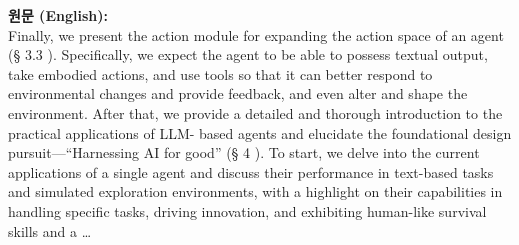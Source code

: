 \documentclass[12pt,a4paper]{article}
\begin{document}
\begin{mdframed}[style=orig]
\noindent\textbf{\small 원문 (English):}\\[2pt]
\small Finally, we present the action module for expanding the action space of an agent (§ 3.3 ). Specifically, we expect the agent to be able to possess textual output, take embodied actions, and use tools so that it can better respond to environmental changes and provide feedback, and even alter and shape the environment. After that, we provide a detailed and thorough introduction to the practical applications of LLM- based agents and elucidate the foundational design pursuit—“Harnessing AI for good” (§ 4 ). To start, we delve into the current applications of a single agent and discuss their performance in text-based tasks and simulated exploration environments, with a highlight on their capabilities in handling specific tasks, driving innovation, and exhibiting human-like survival skills and a \ldots
\end{mdframed}
\vspace{0.4em}
\end{document}
